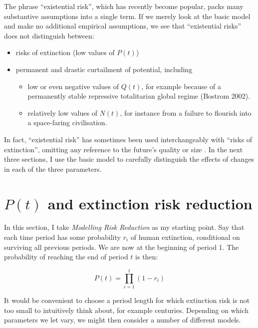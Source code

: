 \documentclass[british]{article}
\begin{document}
The phrase ``existential risk'', which has recently become popular, packs many substantive assumptions into a single term. If we merely look at the basic model and make no additional empirical assumptions, we see that ``existential risks'' does not distinguish between:
\begin{itemize}
\item
  risks of extinction (low values of \(P(t)\))
\item
  permanent and drastic curtailment of potential, including
  \begin{itemize}
  \item
    low or even negative values of \(Q(t)\), for example because of a
    permanently stable repressive totalitarian global regime (Bostrom
    2002).
  \item
    relatively low values of \(N(t)\), for instance from a failure to flourish into a space-faring civilisation.
  \end{itemize}
\end{itemize}

In fact, ``existential risk'' has sometimes been used interchangeably with ``risks of extinction'', omitting any reference to the future's quality or size \citep{althaus_reducing_2016}. In the next three sections, I use the basic model to carefully distinguish the effects of changes in each of the three parameters.

\section{$P(t)$ and extinction risk reduction}\label{pt}

In this section, I take \emph{Modelling Risk Reduction} \citep[personal communication]{ord_modelling_????} as my starting point. Say that each time period has some probability \(r_i\) of human extinction, conditional on surviving all previous periods. We are now at the beginning of period 1. The probability of reaching the end of period \(t\) is then:

\begin{equation}
  P(t) = \prod_{i=1}^{t}(1-r_i) \label{eq:pt}
\end{equation}


It would be convenient to choose a period length for which extinction risk is not too
small to intuitively think about, for example centuries. Depending on which parameters we let vary, we might then consider a number of
different models.
\end{document}
